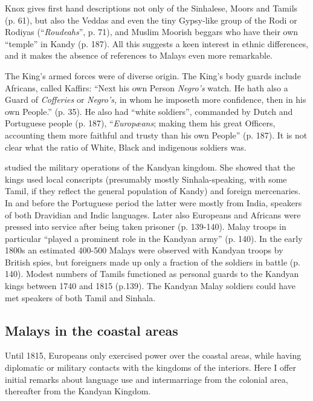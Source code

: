 Knox gives first hand descriptions not only of the Sinhalese, Moors and Tamils (p. 61), but also the Veddas and even the tiny Gypsy-like group of the Rodi or Rodiyas (``\textit{Roudeahs}'', p. 71), and Muslim Moorish beggars who have their own ``temple'' in Kandy (p. 187). All this suggests a keen interest in ethnic differences, and it makes the absence of references to Malays even more remarkable. 

{The King's armed forces were of diverse origin. The King's body guards include Africans, called Kaffirs: ``Next his own Person} {\textit{Negro's}} {watch.} He hath also a Guard of \textit{Cofferies} or \textit{Negro's,} in whom he imposeth more confidence, then in his own People.'' (p. 35). He also had ``white soldiers'', commanded by Dutch and Portuguese people (p. 187), ``\textit{Europ{\ae}ans}; making them his great Officers, accounting them more faithful and trusty than his own People'' (p. 187). It is not clear what the ratio of White, Black and indigenous soldiers was.

\citet{Wickremesekera2004} studied the military operations of the Kandyan kingdom. She showed that the kings used local conscripts (presumably mostly Sinhala-speaking, with some Tamil, if they reflect the general population of  Kandy) and foreign mercenaries. In and before the Portuguese period the latter were mostly from India, speakers of both Dravidian and Indic languages. Later also Europeans and Africans were pressed into service after being taken prisoner (p. 139-140). Malay troops in particular ``played a prominent role in the Kandyan army'' (p. 140).  In the early 1800s an estimated 400-500 Malays were observed with Kandyan troops by British spies, but foreigners made up only a fraction of the soldiers in battle (p. 140). Modest numbers of Tamils functioned as personal guards to the Kandyan kings between 1740 and 1815 (p.139). The Kandyan Malay soldiers could have met speakers of both Tamil and Sinhala.

\subsection{Malays in the coastal areas}\label{bakker:sec:32}
Until 1815, Europeans only exercised power over the coastal areas, while having diplomatic or military contacts with the kingdoms of the interiors. Here I offer initial remarks about language use and intermarriage from the colonial area, thereafter from the Kandyan Kingdom.

